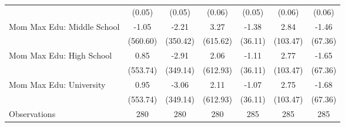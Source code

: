 {\begin{tabular}{l*{6}{c}}
                    &      (0.05)         &      (0.05)         &      (0.06)         &      (0.05)         &      (0.06)         &      (0.06)         \\
\addlinespace
Mom Max Edu: Middle School&       -1.05         &       -2.21         &        3.27         &       -1.38         &        2.84         &       -1.46         \\
                    &    (560.60)         &    (350.42)         &    (615.62)         &     (36.11)         &    (103.47)         &     (67.36)         \\
\addlinespace
Mom Max Edu: High School&        0.85         &       -2.91         &        2.06         &       -1.11         &        2.77         &       -1.65         \\
                    &    (553.74)         &    (349.14)         &    (612.93)         &     (36.11)         &    (103.47)         &     (67.36)         \\
\addlinespace
Mom Max Edu: University&        0.95         &       -3.06         &        2.11         &       -1.07         &        2.75         &       -1.68         \\
                    &    (553.74)         &    (349.14)         &    (612.93)         &     (36.11)         &    (103.47)         &     (67.36)         \\
\midrule
Observations        &         280         &         280         &         280         &         285         &         285         &         285         \\
\bottomrule
\end{tabular}
}
